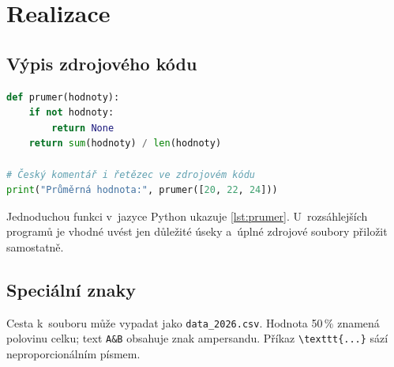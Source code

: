 
\chapter{Realizace}
\label{chap:realizace}

\section{Výpis zdrojového kódu}

\begin{lstlisting}[language=Python,caption={Výpočet průměru naměřených hodnot},label={lst:prumer}]
def prumer(hodnoty):
    if not hodnoty:
        return None
    return sum(hodnoty) / len(hodnoty)

# Český komentář i řetězec ve zdrojovém kódu
print("Průměrná hodnota:", prumer([20, 22, 24]))
\end{lstlisting}

Jednoduchou funkci v~jazyce Python ukazuje \autoref{lst:prumer}.
U~rozsáhlejších programů je vhodné uvést jen důležité úseky a~úplné
zdrojové soubory přiložit samostatně.

\section{Speciální znaky}

Cesta k~souboru může vypadat jako \texttt{data\_2026.csv}.
Hodnota 50\,\% znamená polovinu celku; text \texttt{A\&B} obsahuje znak
ampersandu. Příkaz \verb|\texttt{...}| sází neproporcionálním písmem.
